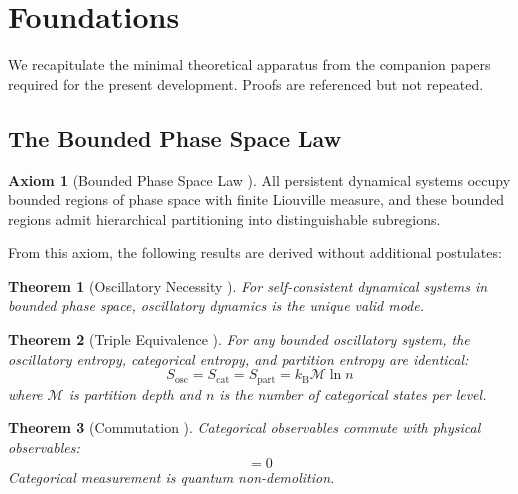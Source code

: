\documentclass[11pt,twocolumn,a4paper]{article}
\newtheorem{theorem}{Theorem}[section]
\theoremstyle{definition}
\newtheorem{axiom}{Axiom}
\theoremstyle{remark}
\newcommand{\kB}{k_{\mathrm{B}}}
\newcommand{\Depth}{\mathcal{M}}
\newcommand{\Ocat}{\hat{O}_{\mathrm{cat}}}
\newcommand{\Ophys}{\hat{O}_{\mathrm{phys}}}
\begin{document}
\section{Foundations}
\label{sec:foundations}

We recapitulate the minimal theoretical apparatus from the companion papers \citep{sachikonye2025a, sachikonye2025b, sachikonye2025c} required for the present development. Proofs are referenced but not repeated.

\subsection{The Bounded Phase Space Law}

\begin{axiom}[Bounded Phase Space Law {\citep[Axiom~1]{sachikonye2025a}}]
\label{ax:bpsl}
All persistent dynamical systems occupy bounded regions of phase space with finite Liouville measure, and these bounded regions admit hierarchical partitioning into distinguishable subregions.
\end{axiom}

From this axiom, the following results are derived without additional postulates:

\begin{theorem}[Oscillatory Necessity {\citep[Theorem~2.4]{sachikonye2025a}}]
\label{thm:oscillatory}
For self-consistent dynamical systems in bounded phase space, oscillatory dynamics is the unique valid mode.
\end{theorem}

\begin{theorem}[Triple Equivalence {\citep[Theorem~3.2]{sachikonye2025a}}]
\label{thm:triple_equiv}
For any bounded oscillatory system, the oscillatory entropy, categorical entropy, and partition entropy are identical:
\begin{equation}
S_{\mathrm{osc}} = S_{\mathrm{cat}} = S_{\mathrm{part}} = \kB \Depth \ln n
\label{eq:triple_equiv}
\end{equation}
where $\Depth$ is partition depth and $n$ is the number of categorical states per level.
\end{theorem}

\begin{theorem}[Commutation {\citep[Theorem~3.5]{sachikonye2025a}}]
\label{thm:commutation}
Categorical observables commute with physical observables:
\begin{equation}
[\Ocat, \Ophys] = 0
\label{eq:commutation}
\end{equation}
Categorical measurement is quantum non-demolition.
\end{theorem}
\end{document}

